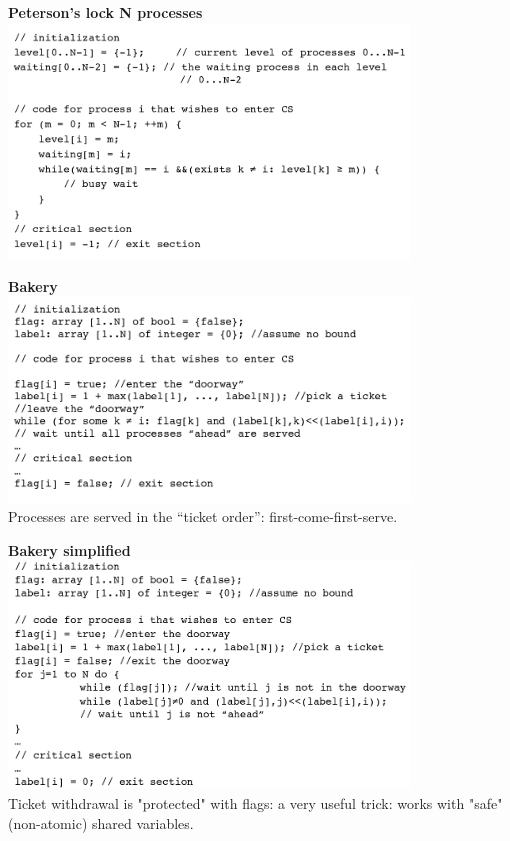 \documentclass{article}
\theoremstyle{definition}
\begin{document}
\begin{center}
	\large{\textbf{Peterson's lock N processes}}\\
	\includegraphics[width=0.8\textwidth]{peterson_N}
\end{center}

\begin{center}
	\large{\textbf{Bakery}}\\
	\includegraphics[width=0.8\textwidth]{bakery}\\
	Processes are served in the “ticket order”: first-come-first-serve.
\end{center}

\begin{center}
	\large{\textbf{Bakery simplified}}\\
	\includegraphics[width=0.8\textwidth]{bakery_2}\\
	Ticket withdrawal is "protected" with flags: a very useful trick: works with "safe" (non-atomic) shared variables.
\end{center}
\end{document}
